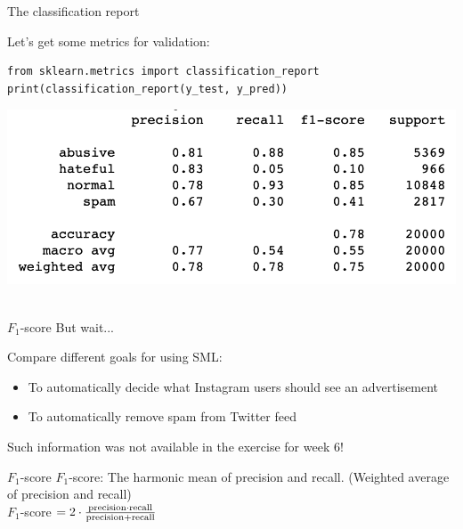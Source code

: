 \documentclass[compress]{beamer}
\begin{document}
\begin{frame}[fragile]{The classification report}
	
Let's get some metrics for validation: 
	
\begin{lstlisting}
from sklearn.metrics import classification_report
print(classification_report(y_test, y_pred))
\end{lstlisting}

\begin{center}
\includegraphics[width=\linewidth,height=\textheight,keepaspectratio]{../pictures/classification-report} \\\
\end{center}

\end{frame}


\begin{frame}{\(F_1\)-score}
But wait...

\begin{alertblock}{Compare different goals for using SML:}
\begin{itemize}
	\item To automatically decide what Instagram users should see an advertisement
	\item To automatically remove spam from Twitter feed
\end{itemize}
\end{alertblock}

Such information was not available in the exercise for week 6!

\end{frame}


\begin{frame}{\(F_1\)-score}
\(F_1\)-score: The harmonic mean of precision and recall.
(Weighted average of precision and recall) \\
	
\(F_1\)-score \(= 2 \cdot \frac{\rm precision \cdot recall}{\rm precision + recall}\)
\end{frame}
\end{document}
